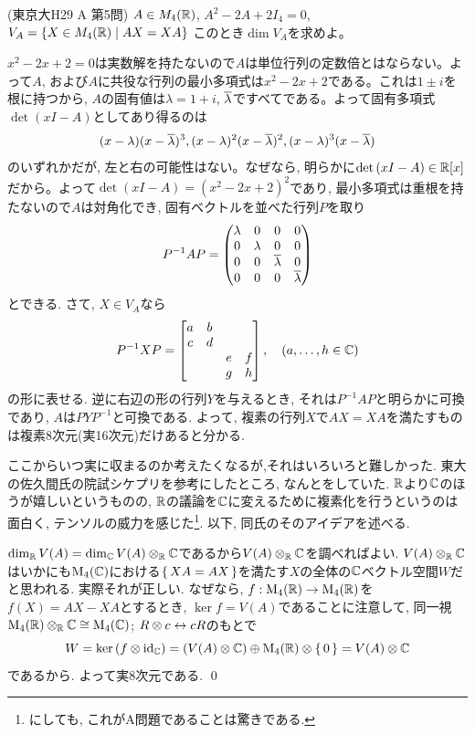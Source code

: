 \begin{egprob} (東京大H29 A 第5問)
$A\in M_{4}(\mathbb{R})$, $A^2 - 2A + 2I_4 =0$, $V_{A} = \{ X\in M_4(\mathbb{R})\mid AX=XA \}$ このとき$\dim V_{A}$を求めよ。
\end{egprob}
\begin{egans}
$x^2 - 2x + 2 = 0$は実数解を持たないので$A$は単位行列の定数倍とはならない。よって$A$, および$A$に共役な行列の最小多項式は$x^2 - 2x + 2$である。これは$1\pm i$を根に持つから, $A$の固有値は$\lambda = 1 + i$, $\overline{\lambda}$ですべてである。よって固有多項式$\det{(xI - A)}$としてあり得るのは
\[(x- \lambda)(x-\overline{\lambda})^{3}, (x-\lambda)^2(x-\overline{\lambda})^2, (x-\lambda)^{3}(x-\overline{\lambda})\]
のいずれかだが, 左と右の可能性はない。なぜなら, 明らかに$\det{(xI - A)}\in \mathbb{R}[x]$だから。よって$\det{(xI - A)} = (x^2 - 2x + 2)^2$であり, 最小多項式は重根を持たないので$A$は対角化でき, 固有ベクトルを並べた行列$P$を取り
\[
P^{-1}AP =
\begin{pmatrix}
\lambda & 0 & 0 & 0\\
0& \lambda & 0 & 0\\
0 & 0 & \overline{\lambda} & 0 \\
0 & 0 & 0& \overline{\lambda}
\end{pmatrix}
\]
とできる. さて, $X \in V_A$なら
\[P^{-1}X P = \begin{bmatrix}a& b \\  c&d \\ && e&f\\ && g& h\end{bmatrix},\quad (a,\dots, h\in \mathbb{C})\]
の形に表せる. 逆に右辺の形の行列$Y$を与えるとき, それは$P^{-1}AP$と明らかに可換であり, $A$は$PYP^{-1}$と可換である. よって, 複素の行列$X$で$AX=XA$を満たすものは複素$8$次元(実16次元)だけあると分かる. \par
ここからいつ実に収まるのか考えたくなるが,それはいろいろと難しかった. 東大の佐久間氏の院試シケプリを参考にしたところ, なんとをしていた. $\mathbb{R}$より$\mathbb{C}$のほうが嬉しいというものの, $\mathbb{R}$の議論を$\mathbb{C}$に変えるために複素化を行うというのは面白く, テンソルの威力を感じた\footnote{にしても, これがA問題であることは驚きである. }.  以下, 同氏のそのアイデアを述べる. \par
$\dim_{\mathbb{R}}V(A) = \dim_{\mathbb{C}} V(A)\mathbin{\otimes}_{\mathbb{R}}\mathbb{C}$であるから$V(A) \mathbin{\otimes}_{\mathbb{R}}\mathbb{C}$を調べればよい. $V(A)\mathbin{\otimes}_{\mathbb{R}}\mathbb{C}$はいかにも$\mathrm{M}_{4}(\mathbb{C})$における$\set{XA=AX}$を満たす$X$の全体の$\mathbb{C}$ベクトル空間$W$だと思われる. 実際それが正しい. なぜなら, $f:\mathrm{M}_{4}(\mathbb{R})\to \mathrm{M}_{4}(\mathbb{R})$を $f(X)= AX-XA$とするとき, $\ker{f} = V(A)$であることに注意して, 同一視$\mathrm{M}_{4}(\mathbb{R})\mathbin{\otimes}_{\mathbb{R}}\mathbb{C} \cong \mathrm{M}_{4}(\mathbb{C})$; $R \mathbin{\otimes} c \leftrightarrow cR$のもとで
\[W = \ker{(f\mathbin{\otimes}\mathrm{id}_{\mathbb{C}})} = (V(A)\mathbin{\otimes} \mathbb{C} )\oplus \mathrm{M}_{4}(\mathbb{R})\mathbin{\otimes} \set{0} = V(A)\mathbin{\otimes} \mathbb{C} \]
であるから. よって実8次元である. \qed




\end{egans}
